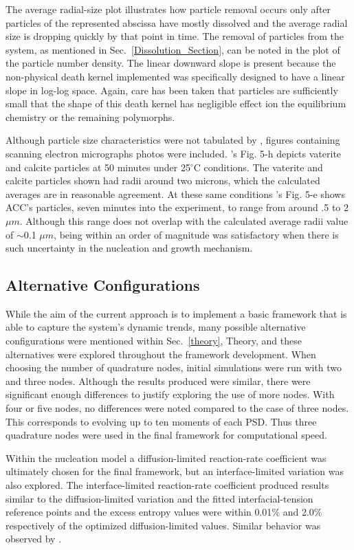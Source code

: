 \documentclass[preprint,3p,a4paper,times,12pt,authoryear]{elsarticle}
\begin{document}
The average radial-size plot illustrates how particle removal occurs only after particles of the represented abscissa have mostly dissolved and the average radial size is dropping quickly by that point in time.  The removal of particles from the system, as mentioned in Sec.~\ref{Dissolution_Section}, can be noted in the plot of the particle number density. The linear downward slope is present because the non-physical death kernel implemented was specifically designed to have a linear slope in log-log space.  Again, care has been taken that particles are sufficiently small that the shape of this death kernel has negligible effect ion the equilibrium chemistry or the remaining polymorphs.   

Although particle size characteristics were not tabulated by \citeauthor{Ogino1987}, figures containing scanning electron micrographs photos were included.  \citeauthor{Ogino1987}'s Fig. 5-h depicts vaterite and calcite particles at 50 minutes under 25$^\circ$C conditions.  The vaterite and calcite particles shown had radii around two microns, which the calculated averages are in reasonable agreement.  At these same conditions  \citeauthor{Ogino1987}'s Fig. 5-e shows ACC's particles, seven minutes into the experiment, to range from around .5 to 2 $\mu m$.  Although this range does not overlap with the calculated average radii value of $\sim$0.1 $\mu m$, being within an order of magnitude was satisfactory when there is such uncertainty in the nucleation and growth mechanism. 

\subsection{Alternative Configurations}
\label{Model_Alternatives}
While the aim of the current approach is to implement a basic framework that is able to capture the system's dynamic trends, many possible alternative configurations were mentioned within Sec.~\ref{theory}, Theory, and these alternatives were explored throughout the framework development.  When choosing the number of quadrature nodes, initial simulations were run with two and three nodes.  Although the results produced were similar,  there were significant enough differences to justify exploring the use of more nodes.  With four or five nodes, no differences were noted compared to the case of three nodes.  This corresponds to evolving up to ten moments of each PSD.  Thus three quadrature nodes were used in the final framework for computational speed.  

Within the nucleation model a diffusion-limited reaction-rate coefficient was ultimately chosen for the final framework, but an interface-limited variation was also explored.  The interface-limited reaction-rate coefficient produced results similar to the diffusion-limited variation and the fitted interfacial-tension reference points and the excess entropy values were within 0.01$\%$ and 2.0$\%$ respectively of the optimized diffusion-limited values.  Similar behavior was observed by \citet{Lindenberg2009}.
\end{document}
